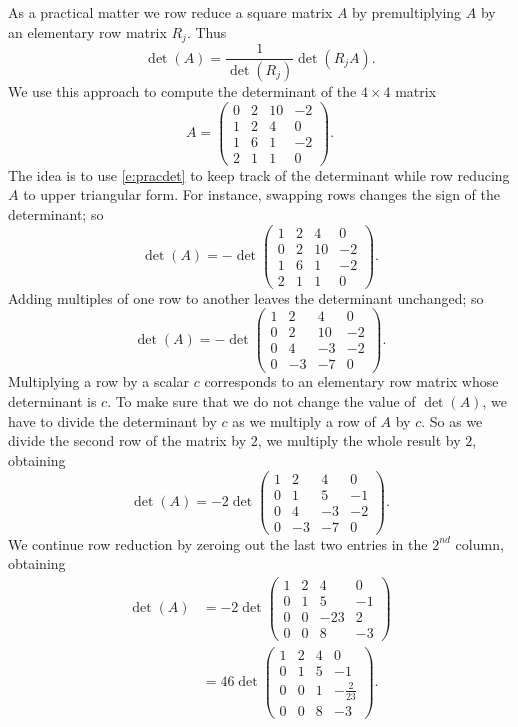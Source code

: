 \documentclass{ximera}
\begin{document}
As a practical matter we row reduce a square matrix $A$ by 
premultiplying $A$ by an elementary row matrix $R_j$.  Thus 
\begin{equation} \label{e:pracdet}
\det(A) = \frac{1}{\det(R_j)} \det (R_j A).
\end{equation}
We use this approach to compute the determinant of the 
$4\times 4$ matrix 
\[
A = \left(\begin{array}{rrrr} 0 & 2 & 10 & -2 \\ 1 & 2 & 4 & 0\\
1 & 6 & 1 & -2 \\ 2 & 1 & 1 & 0 \end{array}\right).
\]
The idea is to use \eqref{e:pracdet} to keep track of the 
determinant while row reducing $A$ to upper triangular form. 
For instance, swapping rows changes the sign of the determinant; 
so
\[
\det(A) = -\det\left(\begin{array}{rrrr} 1 & 2 & 4 & 0\\ 0 & 2 & 10 & -2 \\
1 & 6 & 1 & -2 \\ 2 & 1 & 1 & 0 \end{array}\right).
\]
Adding multiples of one row to another leaves the determinant
unchanged; so
\[
\det(A) = -\det\left(\begin{array}{rrrr} 1 & 2 & 4 & 0\\ 0 & 2 & 10 & -2 \\
0 & 4 & -3 & -2 \\ 0 & -3 & -7 & 0 \end{array}\right).
\]
Multiplying a row by a scalar $c$ corresponds to an elementary 
row matrix whose determinant is $c$.  To make sure that we do not 
change the value of $\det(A)$, we have to divide the determinant by 
$c$ as we multiply a row of $A$ by $c$. So as we divide the second 
row of the matrix by $2$, we multiply the whole result by $2$, obtaining   
\[
\det(A) = -2\det\left(\begin{array}{rrrr} 1 & 2 & 4 & 0\\ 0 & 1 & 5 & -1 \\
0 & 4 & -3 & -2 \\ 0 & -3 & -7 & 0 \end{array}\right).
\] 
We continue row reduction by zeroing out the last two entries in
the $2^{nd}$ column, obtaining
\begin{align*}
\det(A) &= -2\det\left(\begin{array}{rrrr} 1 & 2 & 4 & 0\\ 0 & 1 & 5 & -1 \\
0 & 0 & -23 & 2 \\ 0 & 0 & 8 & -3 \end{array}\right) \\
&= 46\det\left(\begin{array}{rrrr} 1 & 2 & 4 & 0\\ 0 & 1 & 5 & -1 \\
0 & 0 & 1 & -\frac{2}{23} \\ 0 & 0 & 8 & -3 \end{array}\right).
\end{align*}
\end{document}
